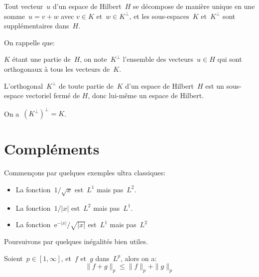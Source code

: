 \medskip
{}

\begin{theoreme}
Tout vecteur~$u$ d'un espace de Hilbert~$H$ se décompose de manière unique en une somme~$u=v+w$ avec
$v\in K$ et~$w\in K^\bot$, et les sous-espaces~$K$ et~$K^\bot$ sont supplémentaires dans~$H$.
\end{theoreme}

On rappelle que:
\begin{definition}
$K$ étant une partie de~$H$, on note~$K^\bot$ l'ensemble des vecteurs~$u\in H$ qui sont orthogonaux à tous les
vecteurs de~$K$.
\end{definition}

\begin{theoreme}
L'orthogonal~$K^\bot$ de toute partie de~$K$ d'un espace de Hilbert~$H$ est un sous-espace vectoriel fermé de
$H$, donc lui-même un espace de Hilbert.

On a~$(K^\bot)^\bot = K$.
\end{theoreme}

\medskip
\section{Compléments}

Commençons par quelques exemples ultra classiques:
\begin{itemize}
  \item La fonction~$1/\sqrt{x}$ est~$L^1$ mais pas~$L^2$.
  \item La fonction~$1/|x|$ est~$L^2$ mais pas~$L^1$.
  \item La fonction~$\mathrm{e}^{-|x|}/\sqrt{|x|}$ est~$L^1$ mais pas~$L^2$
\end{itemize}

\medskip
Poursuivons par quelques inégalités bien utiles.

\begin{theoreme}
Soient~$p\in[1,\infty]$, et~$f$ et~$g$ dans~$L^p$, alors on a:
\begin{equation}\|f+g\|_p\le\|f\|_p+\|g\|_p\end{equation}
\end{theoreme}

